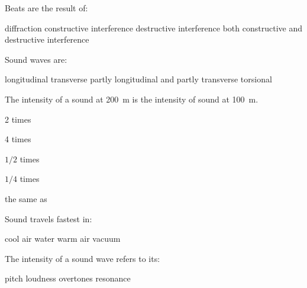 \documentclass{../oss-apphys-exam}
\begin{document}

\begin{questions}
  \question Beats are the result of:
  \begin{choices}
    \choice diffraction
    \choice constructive interference
    \choice destructive interference
    \choice both constructive and destructive interference
  \end{choices}

  \question Sound waves are:
  \begin{choices}
    \choice longitudinal
    \choice transverse
    \choice partly longitudinal and partly transverse
    \choice torsional
  \end{choices}

  \question The intensity of a sound at \SI{200}{\metre} is
  \underline{\hspace{1in}} the intensity of sound at \SI{100}\metre.
  \begin{choices}
  \item 2 times
  \item 4 times
  \item $1/2$ times
  \item $1/4$ times
  \item the same as
  \end{choices}
  
  \question Sound travels fastest in:
  \begin{choices}
    \choice cool air
    \choice water
    \choice warm air
    \choice vacuum
  \end{choices}

  

  \question The intensity of a sound wave refers to its:
  \begin{choices}
    \choice pitch
    \choice loudness
    \choice overtones
    \choice resonance
  \end{choices}


\end{questions}
\end{document}
